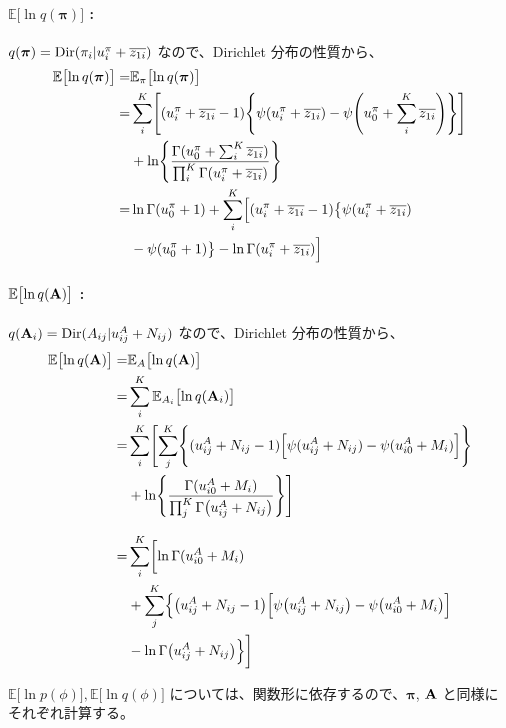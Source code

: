 \paragraph{ $\mathbb{E}\bigl[\ln q({\boldsymbol \pi}) \bigr]$ : }
$q({\boldsymbol \pi}) = {\rm Dir}(\pi_i|u_i^\pi + \overline{z_{1i}})$ なので、Dirichlet  分布の性質から、
\begin{align}
  \mathbb{E}\bigl[\ln q({\boldsymbol \pi}) \bigr]  =&  \mathbb{E}_{\pi}\bigl[ \ln q({\boldsymbol \pi}) \bigr]  \\
%
  =&  \sum_i^K \Biggl[ (u_i^\pi + \overline{z_{1i}} - 1) \Biggl\{ \psi(u_i^\pi + \overline{z_{1i}}) - \psi\Biggl(u_0^\pi + \sum_i^K \overline{z_{1i}}\Biggr) \Biggr\} \Biggr]  \notag  \\  
    &  + \ln \Biggl\{ \frac{ \Gamma(u_0^\pi + \sum_i^K \overline{z_{1i}}) }{ \prod_i^K \Gamma(u_i^\pi + \overline{z_{1i}}) } \Biggr\}  \\
%
  =& \ln \Gamma(u_0^\pi + 1) + \sum_i^K \Bigl[ (u_i^\pi + \overline{z_{1i}} - 1) \bigl\{ \psi(u_i^\pi + \overline{z_{1i}})  \notag  \\  
    &   - \psi(u_0^\pi + 1) \bigr\} - \ln \Gamma(u_i^\pi + \overline{z_{1i}}) \Bigr]  \label{eqn:expLnQPi}
\end{align}

\paragraph{ $\mathbb{E}\bigl[\ln q({\bf A}) \bigr]$ : }
$q({\bf A}_i) = {\rm Dir}(A_{ij}|u_{ij}^A + N_{ij})$ なので、Dirichlet  分布の性質から、
\begin{align}
  \mathbb{E}\bigl[\ln q({\bf A}) \bigr]  =&  \mathbb{E}_{A}\bigl[ \ln q({\bf A}) \bigr]  \\
%
  =&  \sum_i^K \mathbb{E}_{A_i}\bigl[ \ln q({\bf A}_i) \bigr]  \\
%
  =&  \sum_i^K \Biggl[ \sum_j^K \Biggl\{ (u_{ij}^A + N_{ij} - 1) \Bigl[ \psi(u_{ij}^A + N_{ij}) - \psi(u_{i0}^A + M_i) \Bigr] \Biggr\}  \notag  \\  
    &  + \ln \Biggl\{ \frac{ \Gamma(u_{i0}^A + M_i) }{ \prod_j^K \Gamma\bigl(u_{ij}^A + N_{ij}\bigr) } \Biggr\} \Biggr]  \\
%
\intertext{}
%
  =&  \sum_i^K \biggl[ \ln \Gamma(u_{i0}^A + M_i)  \notag  \\
  &  + \sum_j^K \Bigl\{ \bigl(u_{ij}^A + N_{ij} - 1\bigr) \Bigl[ \psi\bigl(u_{ij}^A + N_{ij}\bigr) - \psi\bigl(u_{i0}^A + M_i\bigr) \Bigr]  \notag  \\  
    &  - \ln \Gamma\bigl(u_{ij}^A + N_{ij}\bigr) \Bigr\} \biggr]  \label{eqn:expLnQA}
\end{align}


$\mathbb{E}\bigl[\ln p( \phi ) \bigr], \mathbb{E}\bigl[\ln q( \phi ) \bigr]$ については、関数形に依存するので、${\boldsymbol \pi}$, ${\bf A}$  と同様にそれぞれ計算する。


